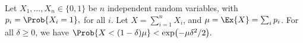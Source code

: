 \begin{lemma}
    Let $X_1, \ldots, X_n \in \{0,1\}$ be $n$ independent random
    variables, with
    \begin{math}
        p_i = \Prob{ \bigl. X_i = 1 },
    \end{math}
    for all $i$.  Let $X = \sum_{i=1}^{n} X_i$, and
    $\mu = \Ex{\bigl. X} = \sum_i p_i$. For all $\delta \geq 0$, we
    have
    \begin{math}
        \Prob{\bigl. X < (1-\delta)\mu } < \exp\bigl(-\mu\delta^2/2
        \bigr).
    \end{math}
\end{lemma}
